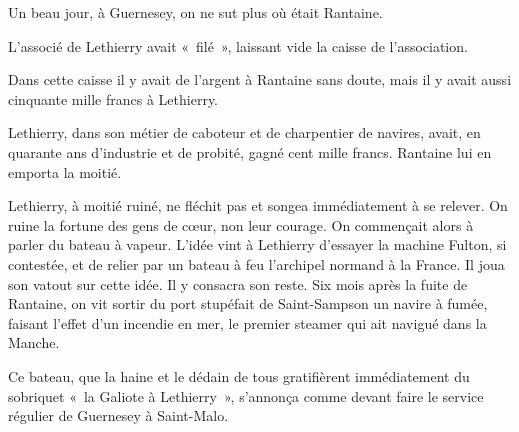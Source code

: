 \documentclass[french,twoside]{book} %
\begin{document}
Un beau jour, à Guernesey, on ne sut plus où était Rantaine.\par
L’associé de Lethierry avait « filé », laissant vide la caisse de l’association.\par
Dans cette caisse il y avait de l’argent à Rantaine sans doute, mais il y avait aussi cinquante mille francs à Lethierry.\par
Lethierry, dans son métier de caboteur et de charpentier de navires, avait, en quarante ans d’industrie et de probité, gagné cent mille francs. Rantaine lui en emporta la moitié.\par
Lethierry, à moitié ruiné, ne fléchit pas et songea immédiatement à se relever. On ruine la fortune des gens de cœur, non leur courage. On commençait alors à parler du bateau à vapeur. L’idée vint à Lethierry d’essayer la machine Fulton, si contestée, et de relier par un bateau à feu l’archipel normand à la France. Il joua son vatout sur cette idée. Il y consacra son reste. Six mois après la fuite de Rantaine, on vit sortir du port stupéfait de Saint-Sampson un navire à fumée, faisant l’effet d’un incendie en mer, le premier steamer qui ait navigué dans la Manche.\par
Ce bateau, que la haine et le dédain de tous gratifièrent immédiatement du sobriquet « la Galiote à Lethierry », s’annonça comme devant faire le service régulier de Guernesey à Saint-Malo.
\end{document}
